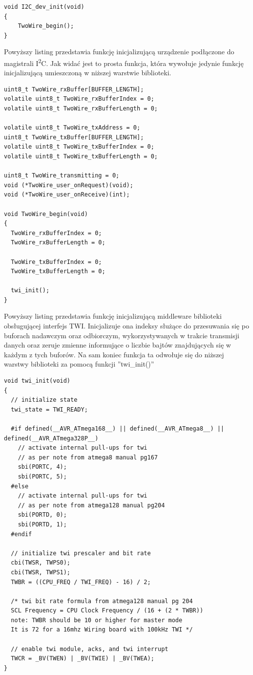 \begin{lstlisting}
void I2C_dev_init(void)
{
	TwoWire_begin();
}
\end{lstlisting}

Powyższy listing przedstawia funkcję inicjalizującą urządzenie podłączone do magistrali I\textsuperscript{2}C. Jak widać jest to prosta funkcja, która wywołuje jedynie funkcję inicjalizującą umieszczoną w niższej warstwie biblioteki.

\begin{lstlisting}
uint8_t TwoWire_rxBuffer[BUFFER_LENGTH];
volatile uint8_t TwoWire_rxBufferIndex = 0;
volatile uint8_t TwoWire_rxBufferLength = 0;

volatile uint8_t TwoWire_txAddress = 0;
uint8_t TwoWire_txBuffer[BUFFER_LENGTH];
volatile uint8_t TwoWire_txBufferIndex = 0;
volatile uint8_t TwoWire_txBufferLength = 0;

uint8_t TwoWire_transmitting = 0;
void (*TwoWire_user_onRequest)(void);
void (*TwoWire_user_onReceive)(int);

void TwoWire_begin(void)
{
  TwoWire_rxBufferIndex = 0;
  TwoWire_rxBufferLength = 0;

  TwoWire_txBufferIndex = 0;
  TwoWire_txBufferLength = 0;

  twi_init();
}
\end{lstlisting}

Powyższy listing przedstawia funkcję inicjalizującą middleware biblioteki obsługującej interfejs TWI. Inicjalizuje ona indeksy służące do przesuwania się po buforach nadawczym oraz odbiorczym, wykorzystywanych w trakcie transmisji danych oraz zeruje zmienne informujące o liczbie bajtów znajdujących się w każdym z tych buforów. Na sam koniec funkcja ta odwołuje się do niższej warstwy biblioteki za pomocą funkcji ''twi\_init()''

\begin{lstlisting}
void twi_init(void)
{
  // initialize state
  twi_state = TWI_READY;

  #if defined(__AVR_ATmega168__) || defined(__AVR_ATmega8__) || defined(__AVR_ATmega328P__)
    // activate internal pull-ups for twi
    // as per note from atmega8 manual pg167
    sbi(PORTC, 4);
    sbi(PORTC, 5);
  #else
    // activate internal pull-ups for twi
    // as per note from atmega128 manual pg204
    sbi(PORTD, 0);
    sbi(PORTD, 1);
  #endif

  // initialize twi prescaler and bit rate
  cbi(TWSR, TWPS0);
  cbi(TWSR, TWPS1);
  TWBR = ((CPU_FREQ / TWI_FREQ) - 16) / 2;

  /* twi bit rate formula from atmega128 manual pg 204
  SCL Frequency = CPU Clock Frequency / (16 + (2 * TWBR))
  note: TWBR should be 10 or higher for master mode
  It is 72 for a 16mhz Wiring board with 100kHz TWI */

  // enable twi module, acks, and twi interrupt
  TWCR = _BV(TWEN) | _BV(TWIE) | _BV(TWEA);
}
\end{lstlisting}

